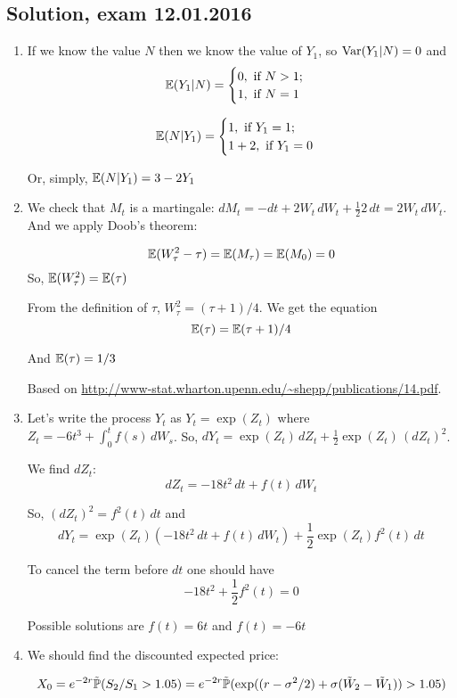 \documentclass[12pt, a4paper]{article}
\begin{document}
\subsection{Solution, exam 12.01.2016}

\begin{enumerate}
\item If we know the value $N$ then we know the value of $Y_1$, so $\Var(Y_1|N)=0$ and
\[
\E(Y_1|N) = \begin{cases}
0, \text{ if } N > 1; \\
1, \text{ if } N = 1
\end{cases}
\]

\[
\E(N|Y_1) = \begin{cases}
1, \text{ if } Y_1 = 1; \\
1 + 2, \text{ if } Y_1 = 0
\end{cases}
\]

Or, simply, $\E(N|Y_1)=3-2Y_1$

\item We check that $M_t$ is a martingale: $dM_t= -dt +2W_t \,dW_t + \frac{1}{2}2\,dt=2W_t\, dW_t$. And we apply Doob's theorem:

\[
\E(W_{\tau}^2-\tau)=\E(M_{\tau})=\E(M_0)=0
\]
So, $\E(W_{\tau}^2)=\E(\tau)$

From the definition of $\tau$, $W_{\tau}^2=(\tau + 1)/4$. We get the equation
\[
\E(\tau)=\E(\tau+1)/4
\]

And $\E(\tau)=1/3$

Based on \url{http://www-stat.wharton.upenn.edu/~shepp/publications/14.pdf}.

\item Let's write the process $Y_t$ as $Y_t=\exp(Z_t)$ where $Z_t = -6t^3 + \int_0^t f(s)\, dW_s$. So, $dY_t = \exp(Z_t) \, dZ_t + \frac{1}{2}\exp(Z_t) \, (dZ_t)^2$.

We find $dZ_t$:
\[
dZ_t = -18t^2 \, dt + f(t) \, dW_t
\]

So, $(dZ_t)^2 = f^2(t) \, dt$ and
\[
dY_t=\exp(Z_t) (-18t^2 \, dt + f(t) \, dW_t) + \frac{1}{2}\exp(Z_t) f^2(t) \, dt
\]

To cancel the term before $dt$ one should have
\[
-18t^2 + \frac{1}{2} f^2(t) = 0
\]

Possible solutions are $f(t)=6t$ and $f(t)=-6t$

\item We should find the discounted expected price:

\[
X_0 = e^{-2r}\tilde\P(S_2/S_1 > 1.05) = e^{-2r} \tilde\P( \exp((r-\sigma^2/2) + \sigma (\tilde W_2 - \tilde W_1)) > 1.05)
\]


\end{enumerate}
\end{document}
